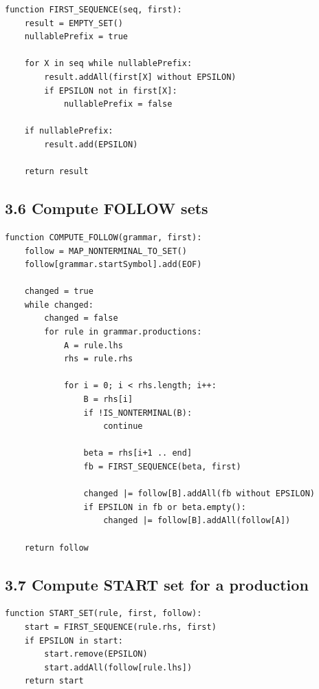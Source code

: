 \documentclass[10pt,letterpaper]{article}
\begin{document}
\begin{verbatim}
function FIRST_SEQUENCE(seq, first):
    result = EMPTY_SET()
    nullablePrefix = true

    for X in seq while nullablePrefix:
        result.addAll(first[X] without EPSILON)
        if EPSILON not in first[X]:
            nullablePrefix = false

    if nullablePrefix:
        result.add(EPSILON)

    return result
\end{verbatim}

\subsection*{3.6 Compute FOLLOW sets}
{}

\begin{verbatim}
function COMPUTE_FOLLOW(grammar, first):
    follow = MAP_NONTERMINAL_TO_SET()
    follow[grammar.startSymbol].add(EOF)

    changed = true
    while changed:
        changed = false
        for rule in grammar.productions:
            A = rule.lhs
            rhs = rule.rhs

            for i = 0; i < rhs.length; i++:
                B = rhs[i]
                if !IS_NONTERMINAL(B):
                    continue

                beta = rhs[i+1 .. end]
                fb = FIRST_SEQUENCE(beta, first)

                changed |= follow[B].addAll(fb without EPSILON)
                if EPSILON in fb or beta.empty():
                    changed |= follow[B].addAll(follow[A])

    return follow
\end{verbatim}

\subsection*{3.7 Compute START set for a production}
{}

\begin{verbatim}
function START_SET(rule, first, follow):
    start = FIRST_SEQUENCE(rule.rhs, first)
    if EPSILON in start:
        start.remove(EPSILON)
        start.addAll(follow[rule.lhs])
    return start
\end{verbatim}
\end{document}
